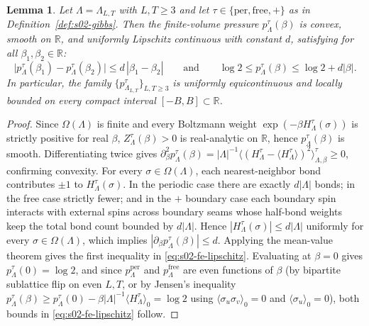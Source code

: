 \documentclass[11pt]{article}
\newtheorem{lemma}[theorem]{Lemma}
\theoremstyle{definition}
\begin{document}
\begin{lemma}
\label{lem:s02-free-energy}
Let $\Lambda = \Lambda_{L,T}$ with $L, T \ge 3$ and let $\tau \in \{\mathrm{per},
\mathrm{free}, +\}$ as in Definition~\ref{def:s02-gibbs}. Then the finite-volume
pressure $p_\Lambda^\tau(\beta)$ is convex, smooth on $\mathbb{R}$, and uniformly
Lipschitz continuous with constant $d$, satisfying for all $\beta_1, \beta_2 \in
\mathbb{R}$:
\begin{equation}
\label{eq:s02-fe-lipschitz}
  \bigl| p_\Lambda^\tau(\beta_1) - p_\Lambda^\tau(\beta_2) \bigr| \le d \, |\beta_1 - \beta_2| \qquad \text{and} \qquad \log 2 \le p_\Lambda^\tau(\beta) \le \log 2 + d |\beta|.
\end{equation}
In particular, the family $\{p_{\Lambda_{L,T}}^\tau\}_{L,T \ge 3}$ is uniformly
equicontinuous and locally bounded on every compact interval $[-B, B] \subset
\mathbb{R}$.
\end{lemma}
\begin{proof}
Since $\Omega(\Lambda)$ is finite and every Boltzmann weight $\exp(-\beta
H_\Lambda^\tau(\sigma))$ is strictly positive for real $\beta$,
$Z_\Lambda^\tau(\beta) > 0$ is real-analytic on $\mathbb{R}$, hence
$p_\Lambda^\tau(\beta)$ is smooth. Differentiating twice gives $\partial_\beta^2
p_\Lambda^\tau(\beta) = |\Lambda|^{-1} \langle (H_\Lambda^\tau - \langle
H_\Lambda^\tau \rangle)^2 \rangle_{\Lambda,\beta}^\tau \ge 0$, confirming convexity.
For every $\sigma \in \Omega(\Lambda)$, each nearest-neighbor bond contributes $\pm
1$ to $H_\Lambda^\tau(\sigma)$. In the periodic case there are exactly $d |\Lambda|$
bonds; in the free case strictly fewer; and in the $+$ boundary case each boundary
spin interacts with external spins across boundary seams whose half-bond weights
keep the total bond count bounded by $d |\Lambda|$. Hence $|H_\Lambda^\tau(\sigma)|
\le d |\Lambda|$ uniformly for every $\sigma \in \Omega(\Lambda)$, which implies
$|\partial_\beta p_\Lambda^\tau(\beta)| \le d$. Applying the mean-value theorem
gives the first inequality in \eqref{eq:s02-fe-lipschitz}. Evaluating at $\beta = 0$
gives $p_\Lambda^\tau(0) = \log 2$, and since $p_\Lambda^{\mathrm{per}}$ and
$p_\Lambda^{\mathrm{free}}$ are even functions of $\beta$ (by bipartite sublattice
flip on even $L, T$, or by Jensen's inequality $p_\Lambda^\tau(\beta) \ge
p_\Lambda^\tau(0) - \beta |\Lambda|^{-1} \langle H_\Lambda^\tau \rangle_0 = \log 2$
using $\langle \sigma_u \sigma_v \rangle_0 = 0$ and $\langle \sigma_u \rangle_0 =
0$), both bounds in \eqref{eq:s02-fe-lipschitz} follow.
\end{proof}
\end{document}
